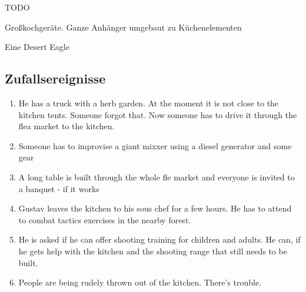 \begin{npcBox}[title=Gustav Müller]
    \begin{stressSection}
    \end{stressSection}
    \begin{tabularx}{\textwidth}{ XX }
    \end{tabularx}

    \begin{consequences}
    \item {}
    \item {}
    \item {}
    \end{consequences}

    \begin{npcDescription}
    TODO
    \end{npcDescription}


    \begin{equipment}
    \item Großkochgeräte. Ganze Anhänger umgebaut zu Küchenelementen
    \item Eine Desert Eagle
    \end{equipment}
\end{npcBox}


\subsection{Zufallsereignisse}

\begin{enumerate}
\item He has a truck with a herb garden. At the moment it is not close to the kitchen tents. Someone forgot that. Now someone has to drive it through the flea market to the kitchen.
\item Someone has to improvise a giant mixxer using a diesel generator and some gear
\item A long table is built through the whole fle market and everyone is invited to a banquet - if it works
\item Gustav leaves the kitchen to his sous chef for a few hours. He has to attend to combat tactics exercises in the nearby forest.
\item He is asked if he can offer shooting training for children and adults. He can, if he gets help with the kitchen and the shooting range that still needs to be built.
\item People are being rudely thrown out of the kitchen. There's trouble.
\end{enumerate}

